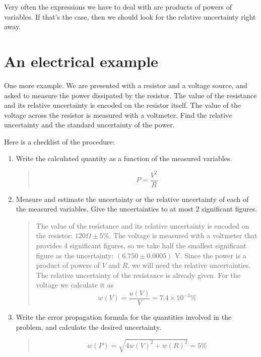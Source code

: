 \documentclass[justified]{tufte-handout}
\begin{document}
Very often the expressions we have to deal with are products of powers
of variables. If that's the case, then we should look for the relative
uncertainty right away.

\section{An electrical example}
One more example. We are presented with a resistor and a voltage
source, and asked to measure the power dissipated by the resistor. The
value of the resistance and its relative uncertainty is encoded on the
resistor itself. The value of the voltage across
the resistor is measured with a voltmeter. Find the relative
uncertainty and the standard uncertainty of the power.

Here is a checklist of the procedure:
\begin{enumerate}
\item 
Write the calculated quantity as a function of the measured variables.
\begin{quote}
  \begin{equation}
    \label{eq:errors_15}
    P=\frac{V^2}{R}
  \end{equation}
\end{quote}
\item
Measure and estimate the uncertainty or the relative uncertainty of
each of the measured variables. Give the uncertainties to at most 2
significant figures. 
\begin{quote}
  The value of the resistance and its relative uncertainty is encoded
  on the resistor: $120\Omega\pm 5$\%. The voltage is measured with a
  voltmeter that provides 4 significant figures, so we take half the
  smallest significant figure as the uncertainty: $(6.750\pm 0.0005)$
  V. Since the power is a product of powers of $V$ and $R$, we will
  need the relative uncertainties. The relative uncertainty of the
  resistance is already given. For the voltage we calculate it as
  \begin{equation}
    \label{eq:errors_16}
    w(V)=\frac{u(V)}{V}=7.4\times 10^{-3}\%
  \end{equation}
\end{quote}
\item
  Write the error propagation formula for the quantities involved in
  the problem, and calculate the desired uncertainty.
  \begin{quote}
    \begin{equation}
      \label{eq:errors_17}
      w(P)=\sqrt{4w(V)^2+w(R)^2}=5\%
    \end{equation}


\end{quote}
\end{enumerate}
\end{document}
